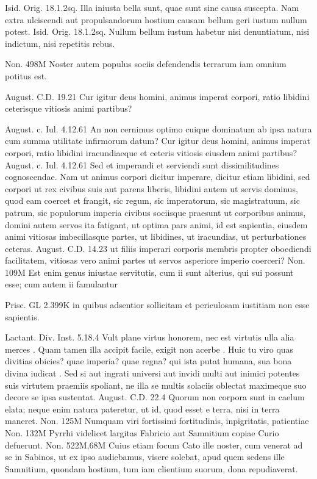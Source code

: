  Isid. Orig. 18.1.2sq. Illa iniusta bella sunt, quae sunt sine causa suscepta. Nam extra ulciscendi aut propulsandorum hostium causam bellum geri iustum nullum potest. Isid. Orig. 18.1.2sq. Nullum bellum iustum habetur nisi denuntiatum, nisi indictum, nisi repetitis rebus.

 Non. 498M Noster autem populus sociis defendendis terrarum iam omnium potitus est.

 August. C.D. 19.21 Cur igitur deus homini, animus imperat corpori, ratio libidini ceterisque vitiosis animi partibus?

 August. c. Iul. 4.12.61 An non cernimus optimo cuique dominatum ab ipsa natura cum summa utilitate infirmorum datum? Cur igitur deus homini, animus imperat corpori, ratio libidini iracundiaeque et ceteris vitiosis eiusdem animi partibus? August. c. Iul. 4.12.61 Sed et imperandi et serviendi sunt dissimilitudines cognoscendae. Nam ut animus corpori dicitur imperare, dicitur etiam libidini, sed corpori ut rex civibus suis aut parens liberis, libidini autem ut servis dominus, quod eam coercet et frangit, sic regum, sic imperatorum, sic magistratuum, sic patrum, sic populorum imperia civibus sociisque praesunt ut corporibus animus, domini autem servos ita fatigant, ut optima pars animi, id est sapientia, eiusdem animi vitiosas imbecillasque partes, ut libidines, ut iracundias, ut perturbationes ceteras. August. C.D. 14.23 ut filiis imperari corporis membris propter oboediendi facilitatem, vitiosas vero animi partes ut servos asperiore imperio coerceri? Non. 109M Est enim genus iniustae servitutis, cum ii sunt alterius, qui sui possunt esse; cum autem ii famulantur

 Prisc. GL 2.399K in quibus adsentior sollicitam et periculosam iustitiam non esse sapientis.

 Lactant. Div. Inst. 5.18.4 Vult plane virtus honorem, nec est virtutis ulla alia merces . Quam tamen illa accipit facile, exigit non acerbe . Huic tu viro quas divitias obicies? quae imperia? quae regna? qui ista putat humana, sua bona divina iudicat . Sed si aut ingrati universi aut invidi multi aut inimici potentes suis virtutem praemiis spoliant, ne illa se multis solaciis oblectat maximeque suo decore se ipsa sustentat. August. C.D. 22.4 Quorum non corpora sunt in caelum elata; neque enim natura pateretur, ut id, quod esset e terra, nisi in terra maneret. Non. 125M Numquam viri fortissimi fortitudinis, inpigritatis, patientiae Non. 132M Pyrrhi videlicet largitas Fabricio aut Samnitium copiae Curio defuerunt. Non. 522M,68M Cuius etiam focum Cato ille noster, cum venerat ad se in Sabinos, ut ex ipso audiebamus, visere solebat, apud quem sedens ille Samnitium, quondam hostium, tum iam clientium suorum, dona repudiaverat.

